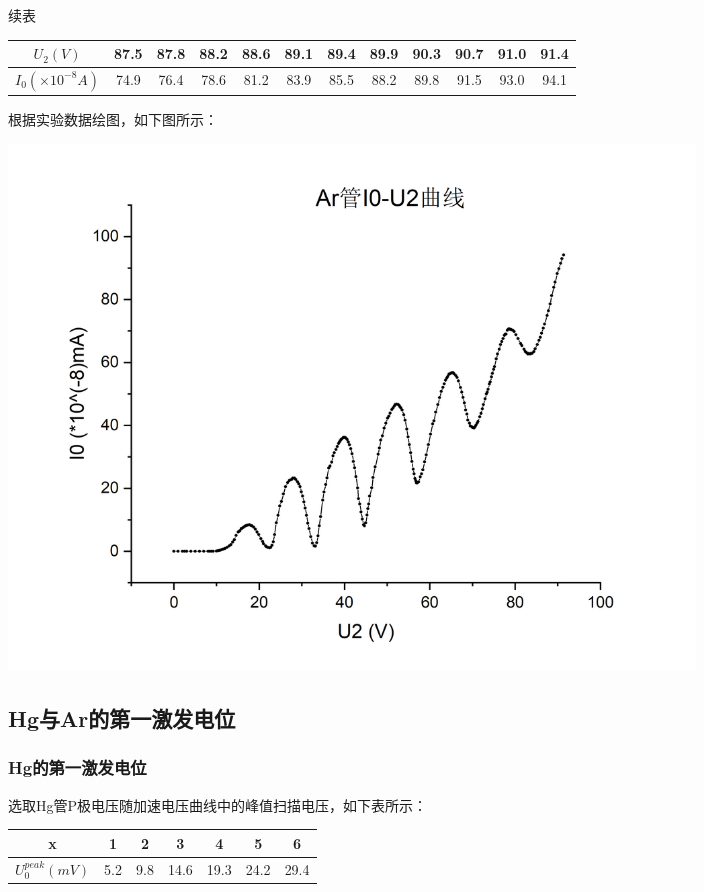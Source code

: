\documentclass{article}
\begin{document}
    续表

    \begin{center}
        \begin{tabular}{|c|c|c|c|c|c|c|c|c|c|c|c|}
            \hline
            $U_2(V)$ & 87.5  & 87.8  & 88.2  & 88.6  & 89.1  & 89.4  & 89.9  & 90.3  & 90.7  & 91.0  & 91.4  \bigstrut\\
            \hline
            $I_0(\times 10^{-8}A)$ & 74.9  & 76.4  & 78.6  & 81.2  & 83.9  & 85.5  & 88.2  & 89.8  & 91.5  & 93.0  & 94.1  \bigstrut\\
            \hline
        \end{tabular}%
    \end{center}

    根据实验数据绘图，如下图所示：

    \begin{center}
        \includegraphics[width=0.8\textwidth]{Ar curve.jpg}
    \end{center}

    \subsection{Hg与Ar的第一激发电位}
    \subsubsection{Hg的第一激发电位}
    选取Hg管P极电压随加速电压曲线中的峰值扫描电压，如下表所示：

    \begin{center}
        \begin{tabular}{|c|c|c|c|c|c|c|}
            \hline
            x     & 1     & 2     & 3     & 4     & 5     & 6  \bigstrut\\
            \hline
            $U_0^{peak}(mV)$ & 5.2   & 9.8   & 14.6  & 19.3  & 24.2  & 29.4  \bigstrut\\
            \hline
        \end{tabular}%
    \end{center}
\end{document}
